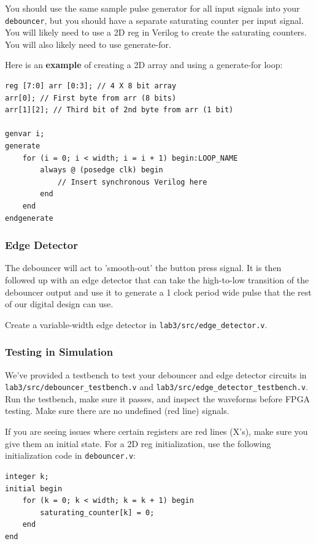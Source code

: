 \documentclass[11pt]{article}
\begin{document}
You should use the same sample pulse generator for all input signals into your \verb|debouncer|, but you should have a separate saturating counter per input signal. You will likely need to use a 2D reg in Verilog to create the saturating counters. You will also likely need to use generate-for.

Here is an \textbf{example} of creating a 2D array and using a generate-for loop:

\begin{verbatim}
reg [7:0] arr [0:3]; // 4 X 8 bit array
arr[0]; // First byte from arr (8 bits)
arr[1][2]; // Third bit of 2nd byte from arr (1 bit)

genvar i;
generate
	for (i = 0; i < width; i = i + 1) begin:LOOP_NAME
		always @ (posedge clk) begin
			// Insert synchronous Verilog here
		end
	end
endgenerate
\end{verbatim}

\subsubsection{Edge Detector}

The debouncer will act to 'smooth-out' the button press signal. It is then followed up with an edge detector that can take the high-to-low transition of the debouncer output and use it to generate a 1 clock period wide pulse that the rest of our digital design can use.

Create a variable-width edge detector in \verb|lab3/src/edge_detector.v|. 

\subsubsection{Testing in Simulation}

We've provided a testbench to test your debouncer and edge detector circuits in \verb|lab3/src/debouncer_testbench.v| and \verb|lab3/src/edge_detector_testbench.v|. Run the testbench, make sure it passes, and inspect the waveforms before FPGA testing. Make sure there are no undefined (red line) signals.

If you are seeing issues where certain registers are red lines (X's), make sure you give them an initial state. For a 2D reg initialization, use the following initialization code in \verb|debouncer.v|:

\begin{verbatim}
integer k;
initial begin
	for (k = 0; k < width; k = k + 1) begin
		saturating_counter[k] = 0;
	end
end
\end{verbatim}
\end{document}
